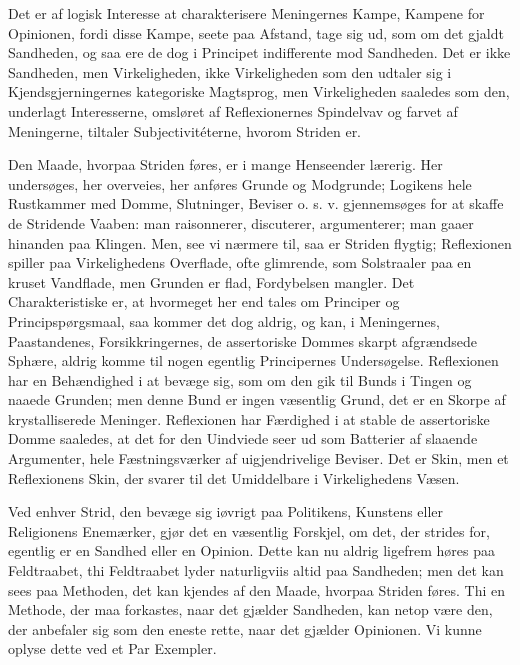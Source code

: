 \documentclass[12pt]{book}
\newcommand{\opage}[1]{\marginnote{\footnotesize\textit{[#1]}}}
\begin{document}
Det er af logisk Interesse at charakterisere Meningernes
Kampe, Kampene for Opinionen, fordi disse Kampe, seete
paa Afstand, tage sig ud, som om det gjaldt Sandheden, og saa
ere de dog i Principet indifferente mod Sandheden. Det er
ikke Sandheden, men Virkeligheden, ikke Virkeligheden som
den udtaler sig i Kjendsgjerningernes kategoriske Magtsprog,
men Virkeligheden saaledes som den, underlagt Interesserne,
omsløret af Reflexionernes Spindelvav og farvet af Meningerne,
tiltaler Subjectivitéterne, hvorom Striden er. %

Den Maade, hvorpaa Striden føres, er i mange Henseender
lærerig. Her undersøges, her overveies, her anføres
Grunde og Modgrunde; Logikens hele Rustkammer med
Domme, Slutninger, Beviser o. s. v. gjennemsøges for at
skaffe de Stridende Vaaben: man raisonnerer, discuterer,
argumenterer; man gaaer hinanden paa Klingen. Men, see
vi nærmere til, saa er Striden flygtig; Reflexionen spiller
paa Virkelighedens Overflade, ofte glimrende, som Solstraaler
paa en kruset Vandflade, men Grunden er flad, Fordybelsen
mangler. Det Charakteristiske er, at hvormeget her end tales
om Principer og Principspørgsmaal, saa kommer det dog
aldrig, og kan, i Meningernes, Paastandenes, Forsikkringernes,
de assertoriske Dommes skarpt afgrændsede Sphære, aldrig
komme til nogen egentlig Principernes Undersøgelse. Reflexionen
har en Behændighed i at bevæge sig, som om den
gik til Bunds i Tingen og naaede Grunden; men denne
Bund er ingen væsentlig Grund, det er en Skorpe af krystalliserede
Meninger. Reflexionen har Færdighed i at stable de
assertoriske Domme saaledes, at det for den Uindviede seer
ud som Batterier af slaaende Argumenter, hele Fæstningsværker
af uigjendrivelige Beviser. Det er Skin, men et Reflexionens
Skin, der svarer til det Umiddelbare i Virkelighedens Væsen.

Ved enhver Strid, den bevæge sig iøvrigt paa Politikens,
\opage{198}Kunstens eller Religionens Enemærker, gjør det en væsentlig
Forskjel, om det, der strides for, egentlig er en Sandhed eller
en Opinion. Dette kan nu aldrig ligefrem høres paa Feldtraabet,
thi Feldtraabet lyder naturligviis altid paa Sandheden;
men det kan sees paa Methoden, det kan kjendes af den
Maade, hvorpaa Striden føres. Thi en Methode, der maa
forkastes, naar det gjælder Sandheden, kan netop være den,
der anbefaler sig som den eneste rette, naar det gjælder Opinionen.
Vi kunne oplyse dette ved et Par Exempler.
\end{document}
